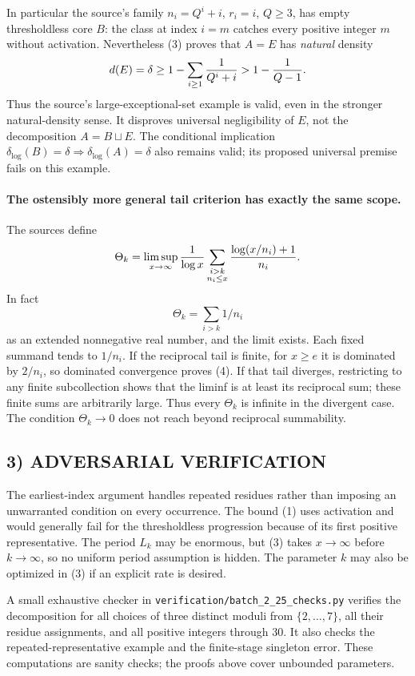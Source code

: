 In particular the source's family $n_i=Q^i+i$, $r_i=i$, $Q\ge3$, has empty thresholdless core $B$: the class at index $i=m$ catches every positive integer $m$ without activation. Nevertheless (3) proves that $A=E$ has \emph{natural} density
\[
 d(E)=\delta\ge1-\sum_{i\ge1}{1\over Q^i+i}>1-{1\over Q-1}.
\]
Thus the source's large-exceptional-set example is valid, even in the stronger natural-density sense. It disproves universal negligibility of $E$, not the decomposition $A=B\sqcup E$. The conditional implication $\delta_{\log}(B)=\delta\Rightarrow\delta_{\log}(A)=\delta$ also remains valid; its proposed universal premise fails on this example.

\paragraph{The ostensibly more general tail criterion has exactly the same scope.}
The sources define
\[
\Theta_k=\limsup_{x\to\infty}{1\over\log x}
\sum_{\substack{i>k\\n_i\le x}}{\log(x/n_i)+1\over n_i}.
\]
In fact
\[
 \boxed{\Theta_k=\sum_{i>k}1/n_i}\tag{4}
\]
as an extended nonnegative real number, and the limit exists. Each fixed summand tends to $1/n_i$. If the reciprocal tail is finite, for $x\ge e$ it is dominated by $2/n_i$, so dominated convergence proves (4). If that tail diverges, restricting to any finite subcollection shows that the liminf is at least its reciprocal sum; these finite sums are arbitrarily large. Thus every $\Theta_k$ is infinite in the divergent case. The condition $\Theta_k\to0$ does not reach beyond reciprocal summability.

\subsection{3) ADVERSARIAL VERIFICATION}
The earliest-index argument handles repeated residues rather than imposing an unwarranted condition on every occurrence. The bound (1) uses activation and would generally fail for the thresholdless progression because of its first positive representative. The period $L_k$ may be enormous, but (3) takes $x\to\infty$ before $k\to\infty$, so no uniform period assumption is hidden. The parameter $k$ may also be optimized in (3) if an explicit rate is desired.

A small exhaustive checker in \texttt{verification/batch\_2\_25\_checks.py} verifies the decomposition for all choices of three distinct moduli from $\{2,\ldots,7\}$, all their residue assignments, and all positive integers through 30. It also checks the repeated-representative example and the finite-stage singleton error. These computations are sanity checks; the proofs above cover unbounded parameters.

